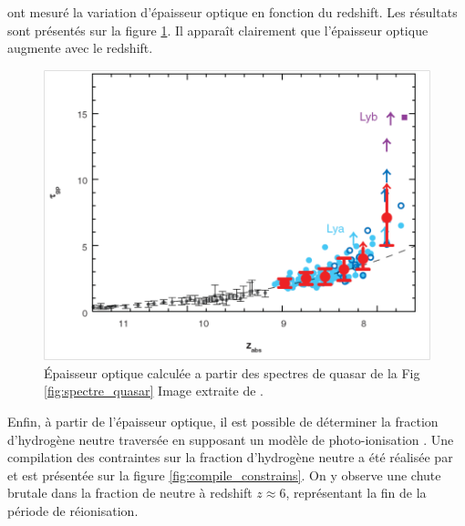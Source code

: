 \cite{fan_constraining_2006} ont mesuré la variation d'épaisseur optique en fonction du redshift.
Les résultats sont présentés sur la figure \ref{fig:epaisseur_optique_quasar}.
Il apparaît clairement que l'épaisseur optique augmente avec le redshift.



\begin{figure}
        \includegraphics[width=.95\linewidth]{img/01/epaisseur_optique_quasar.png} 
        \caption[Epaisseur optique Lyman alpha]{%
		Épaisseur optique calculée a partir des spectres de quasar de la Fig\,\ref{fig:spectre_quasar}
        Image extraite de \cite{fan_constraining_2006}.}
 		\label{fig:epaisseur_optique_quasar}
\end{figure}


Enfin, à partir de l'épaisseur optique, il est possible de déterminer la fraction d'hydrogène neutre traversée en supposant un modèle de photo-ionisation \citep{miralda-escude_reionization_2000}.
Une compilation des contraintes sur la fraction d'hydrogène neutre a été réalisée par \cite{2015ApJ...811..140B} et est présentée sur la figure \ref{fig:compile_constrains}.
On y observe une chute brutale dans la fraction de neutre à redshift $z\approx6$, représentant la fin de la période de réionisation.

